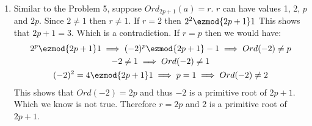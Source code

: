 \begin{enumerate}[label=]
    \item 
        Similar to the Problem 5, suppose $Ord_{2p + 1}(a) = r$. $r$ can have values 1, 2, $p$ and $2p$. Since $2 \ne 1$ then $r \ne 1$. If $r = 2$ then $2^2 \ezmod{2p + 1} 1$ This shows that $2p + 1 = 3$. Which is a contradiction. If $r = p$ then we would have:
        \begin{gather*}
            2^p \ezmod{2p + 1} 1 \implies (-2)^p \ezmod{2p + 1} -1 \implies Ord(-2) \ne p\\
            -2 \ne 1 \implies Ord(-2) \ne 1 \\
            (-2)^2 = 4 \ezmod{2p + 1} 1 \implies p = 1 \implies Ord(-2) \ne 2
        \end{gather*}
        This shows that $Ord(-2) = 2p$ and thus $-2$ is a primitive root of $2p + 1$. Which we know is not true. Therefore $r = 2p$ and 2 is a primitive root of $2p + 1$.
\end{enumerate}